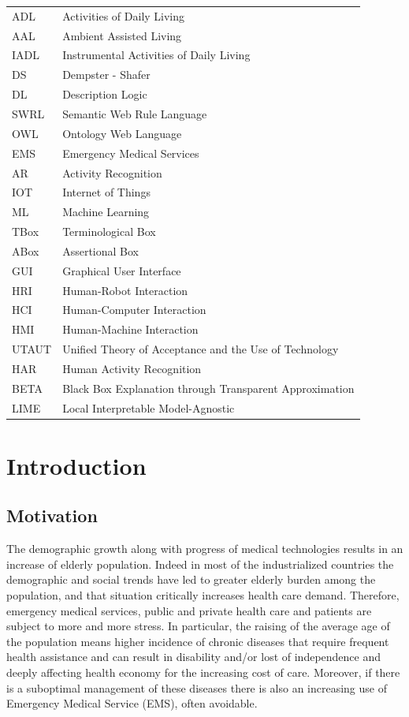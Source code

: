 \documentclass{thesisreport}
\begin{document}
 \begin{tabular}{p{2cm}p{12cm}}
 ADL & Activities of Daily Living\\
 AAL & Ambient Assisted Living \\
 IADL & Instrumental Activities of Daily Living \\
 DS & Dempster - Shafer \\
 DL & Description Logic \\
 SWRL & Semantic Web Rule Language\\
 OWL & Ontology Web Language\\
 EMS & Emergency Medical Services \\
 AR & Activity Recognition \\
 IOT & Internet of Things \\
 ML & Machine Learning \\
 TBox & Terminological Box \\
 ABox & Assertional Box \\
 GUI & Graphical User Interface \\
 HRI & Human-Robot Interaction \\
 HCI & Human-Computer Interaction \\
 HMI & Human-Machine Interaction \\
 UTAUT & Unified Theory of Acceptance and the Use of Technology \\
 HAR & Human Activity Recognition \\
 BETA & Black Box Explanation through Transparent Approximation\\
 LIME & Local  Interpretable  Model-Agnostic
 \end{tabular}

 \listoffigures
 
 \listoftables
 
 \tableofcontents
 
 
 \chapter{Introduction}

\section{Motivation}
  The demographic growth along with progress of medical technologies results in an increase of elderly population. Indeed in most of the industrialized countries the demographic and social trends have led to greater elderly burden among the population, and that situation critically increases health care demand. Therefore, emergency medical services, public and private health care and patients are subject to more and more stress. 
  In particular, the raising of the average age of the population means higher incidence of chronic diseases that require frequent health assistance and can result in disability and/or lost of independence and deeply affecting health economy for the increasing cost of care. Moreover, if there is a suboptimal management of these diseases there is also an increasing use of Emergency Medical Service (EMS), often avoidable.
 
\end{document}
